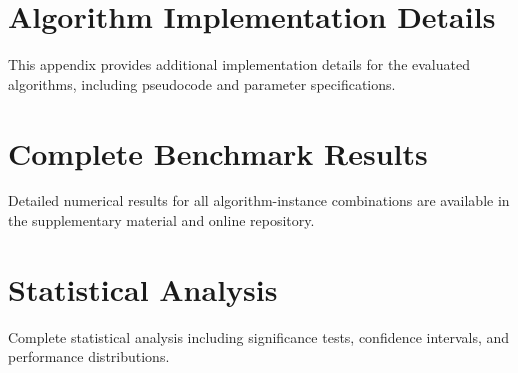 \documentclass[11pt,a4paper]{article}
\begin{document}
\appendix

\section{Algorithm Implementation Details}

This appendix provides additional implementation details for the evaluated algorithms, including pseudocode and parameter specifications.

\section{Complete Benchmark Results}

Detailed numerical results for all algorithm-instance combinations are available in the supplementary material and online repository.

\section{Statistical Analysis}

Complete statistical analysis including significance tests, confidence intervals, and performance distributions.
\end{document}
